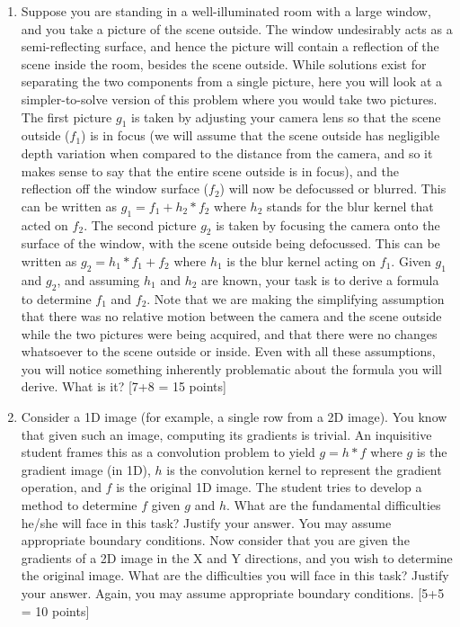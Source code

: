 \documentclass[11pt]{article}
\begin{document}
\begin{enumerate}
\item Suppose you are standing in a well-illuminated room with a large window, and you take a picture of the scene outside. The window undesirably acts as a semi-reflecting surface, and hence the picture will contain a reflection of the scene inside the room, besides the scene outside. While solutions exist for separating the two components from a single picture, here you will look at a simpler-to-solve version of this problem where you would take two pictures. The first picture $g_1$ is taken by adjusting your camera lens so that the scene outside ($f_1$) is in focus (we will assume that the scene outside has negligible depth variation when compared to the distance from the camera, and so it makes sense to say that the entire scene outside is in focus), and the reflection off the window surface ($f_2$) will now be defocussed or blurred.  This can be written as $g_1 = f_1 + h_2 * f_2$ where $h_2$ stands for the blur kernel that acted on $f_2$. The second picture $g_2$ is taken by focusing the camera onto the surface of the window, with the scene outside being defocussed. This can be written as $g_2 = h_1 * f_1 + f_2$ where $h_1$ is the blur kernel acting on $f_1$. Given $g_1$ and $g_2$, and assuming $h_1$ and $h_2$ are known, your task is to derive a formula to determine $f_1$ and $f_2$. Note that we are making the simplifying assumption that there was no relative motion between the camera and the scene outside while the two pictures were being acquired, and that there were no changes whatsoever to the scene outside or inside. Even with all these assumptions, you will notice something inherently problematic about the formula you will derive. What is it? \textsf[7+8 = 15 points]

\item Consider a 1D image (for example, a single row from a 2D image). You know that given such an image, computing its gradients is trivial. An inquisitive student frames this as a convolution problem to yield $g = h*f$ where $g$ is the gradient image (in 1D), $h$ is the convolution kernel to represent the gradient operation, and $f$ is the original 1D image. The student tries to develop a method to determine $f$ given $g$ and $h$. What are the fundamental difficulties he/she will face in this task? Justify your answer. You may assume appropriate boundary conditions. Now consider that you are given the gradients of a 2D image in the X and Y directions, and you wish to determine the original image. What are the difficulties you will face in this task? Justify your answer. Again, you may assume appropriate boundary conditions. \textsf{[5+5 = 10 points]}


\end{enumerate}
\end{document}

